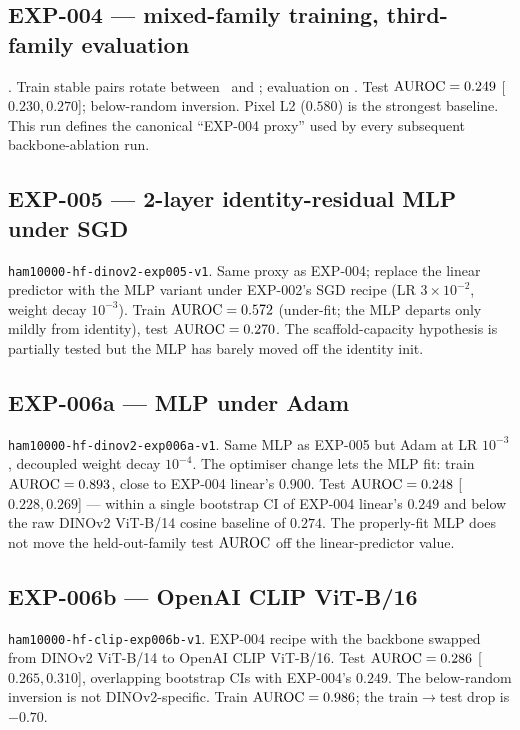 \subsection{EXP-004 --- mixed-family training, third-family evaluation}
\label{app:per-run:exp004}
. Train stable pairs rotate between
\strongfam\ and \strongholdone; evaluation on \strongholdtwo. Test
$\mathrm{AUROC} = 0.249$ [$0.230, 0.270$]; below-random inversion. Pixel L2
($0.580$) is the strongest baseline. This run defines the canonical
``EXP-004 proxy'' used by every subsequent backbone-ablation run.

\subsection{EXP-005 --- 2-layer identity-residual MLP under SGD}
\label{app:per-run:exp005}
\texttt{ham10000-hf-dinov2-exp005-v1}. Same proxy as EXP-004; replace the
linear predictor with the MLP variant under EXP-002's SGD recipe (LR
$3\!\times\!10^{-2}$, weight decay $10^{-3}$). Train $\mathrm{AUROC} = 0.572$
(under-fit; the MLP departs only mildly from identity), test
$\mathrm{AUROC} = 0.270$. The scaffold-capacity hypothesis is partially tested
but the MLP has barely moved off the identity init.

\subsection{EXP-006a --- MLP under Adam}
\label{app:per-run:exp006a}
\texttt{ham10000-hf-dinov2-exp006a-v1}. Same MLP as EXP-005 but Adam at
LR $10^{-3}$, decoupled weight decay $10^{-4}$. The optimiser change lets
the MLP fit: train $\mathrm{AUROC} = 0.893$, close to EXP-004 linear's $0.900$.
Test $\mathrm{AUROC} = 0.248$ [$0.228, 0.269$] --- within a single bootstrap CI of
EXP-004 linear's $0.249$ and below the raw DINOv2 ViT-B/14 cosine baseline
of $0.274$. The properly-fit MLP does not move the held-out-family test
$\mathrm{AUROC}$ off the linear-predictor value.

\subsection{EXP-006b --- OpenAI CLIP ViT-B/16}
\label{app:per-run:exp006b}
\texttt{ham10000-hf-clip-exp006b-v1}. EXP-004 recipe with the backbone
swapped from DINOv2 ViT-B/14 to OpenAI CLIP ViT-B/16. Test $\mathrm{AUROC} =
0.286$ [$0.265, 0.310$], overlapping bootstrap CIs with EXP-004's $0.249$.
The below-random inversion is not DINOv2-specific. Train $\mathrm{AUROC} = 0.986$;
the train$\to$test drop is $-0.70$.

